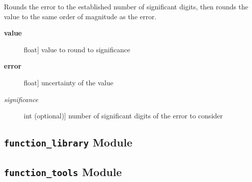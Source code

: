 \documentclass[a4paper,10pt,english]{sphinxmanual}
\begin{document}

\begin{fulllineitems}
\label{index:kafe.fit.round_to_significance}
Rounds the error to the established number of significant digits, then
rounds the value to the same order of magnitude as the error.
\begin{description}
\item[{\textbf{value}}] \leavevmode{[}float{]}
value to round to significance

\item[{\textbf{error}}] \leavevmode{[}float{]}
uncertainty of the value

\item[{\emph{significance}}] \leavevmode{[}int (optional){]}
number of significant digits of the error to consider

\end{description}

\end{fulllineitems}



\subsection{\texttt{function\_library} Module}
\label{index:module-kafe.function_library}\label{index:function-library-module}\label{index:module-function_library}

\subsection{\texttt{function\_tools} Module}
\label{index:module-kafe.function_tools}\label{index:function-tools-module}
\end{document}
